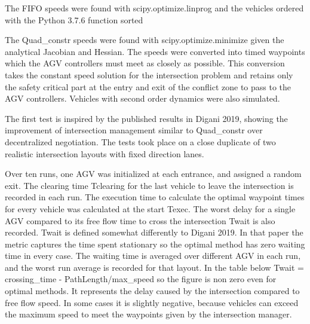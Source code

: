 \documentclass[11pt]{article} %
\begin{document}
The FIFO speeds were found with scipy.optimize.linprog and the vehicles ordered with the Python 3.7.6 function sorted

The Quad\_constr speeds were found with scipy.optimize.minimize given the analytical Jacobian and Hessian.
The speeds were converted into timed waypoints which the AGV controllers must meet as closely as possible. This conversion takes the constant speed solution for the intersection problem and retains only the safety critical part at the entry and exit of the conflict zone to pass to the AGV controllers. Vehicles with second order dynamics were also simulated.

The first test is inspired by the published results in Digani 2019, showing the improvement of intersection management similar to Quad\_constr over decentralized negotiation. The tests took place on a close duplicate of two realistic intersection layouts with fixed direction lanes.

Over ten runs, one AGV was initialized at each entrance, and assigned a random exit.   The clearing time Tclearing for the last vehicle to leave the intersection is recorded in each run. The execution time to calculate the optimal waypoint times for every vehicle was calculated at the start Texec. The worst delay for a single AGV compared to its free flow time to cross the intersection Twait is also recorded.
Twait is defined somewhat differently to Digani 2019. In that paper the metric captures the time spent stationary so the optimal method has zero waiting time in every case. The waiting time is averaged over different AGV in each run, and the worst run average is recorded for that layout.
In the table below Twait = crossing\_time - PathLength/max\_speed so the figure is non zero even for optimal methods. It represents the delay caused by the intersection compared to free flow speed. In some cases it is slightly negative, because vehicles can exceed the maximum speed to meet the waypoints given by the intersection manager.   
\end{document}
